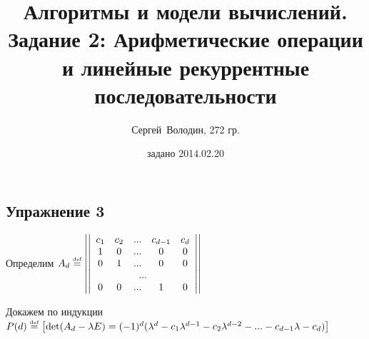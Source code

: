 \documentclass[a4paper]{article}
\title{Алгоритмы и модели вычислений.\\Задание 2: Арифметические операции и линейные рекуррентные последовательности}
\date{задано 2014.02.20}
\author{Сергей~Володин, 272 гр.}
\newcommand{\matrixl}{\left|\left|}
\newcommand{\matrixr}{\right|\right|}
\def\eqdef{\overset{\mbox{\tiny def}}{=}}
\begin{document}
\maketitle
\subsection*{Упражнение 3}
Определим $A_d\eqdef\matrixl
\begin{array}{ccccc}
c_1 & c_2 & ... & c_{d-1} & c_d \\
1   & 0   & ... & 0 & 0\\
0 & 1 & ... & 0 & 0\\
\multicolumn{5}{c}{...}\\
0 & 0 & ... & 1 & 0
\end{array}
\matrixr$

Докажем по индукции $P(d)\eqdef \left[\det(A_d-\lambda E)=(-1)^d(\lambda^d-c_1\lambda^{d-1}-c_2\lambda^{d-2}-...-c_{d-1}\lambda-c_d)\right]$
\end{document}
